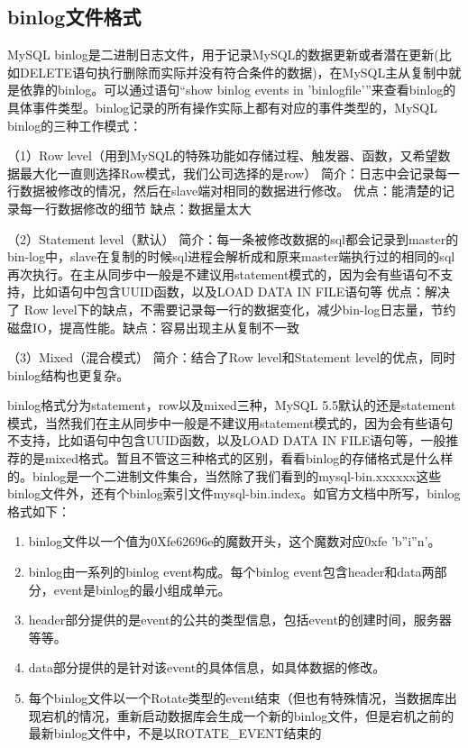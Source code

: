 \documentclass[../../../interview-questions.tex]{subfiles}
\begin{document}
\subsection{binlog文件格式}

MySQL binlog是二进制日志文件，用于记录MySQL的数据更新或者潜在更新(比如DELETE语句执行删除而实际并没有符合条件的数据)，在MySQL主从复制中就是依靠的binlog。可以通过语句“show binlog events in 'binlogfile'”来查看binlog的具体事件类型。binlog记录的所有操作实际上都有对应的事件类型的，MySQL binlog的三种工作模式：

（1）Row level（用到MySQL的特殊功能如存储过程、触发器、函数，又希望数据最大化一直则选择Row模式，我们公司选择的是row）
简介：日志中会记录每一行数据被修改的情况，然后在slave端对相同的数据进行修改。
优点：能清楚的记录每一行数据修改的细节
缺点：数据量太大

（2）Statement level（默认）
简介：每一条被修改数据的sql都会记录到master的bin-log中，slave在复制的时候sql进程会解析成和原来master端执行过的相同的sql再次执行。在主从同步中一般是不建议用statement模式的，因为会有些语句不支持，比如语句中包含UUID函数，以及LOAD DATA IN FILE语句等
优点：解决了 Row level下的缺点，不需要记录每一行的数据变化，减少bin-log日志量，节约磁盘IO，提高性能。缺点：容易出现主从复制不一致

（3）Mixed（混合模式）
简介：结合了Row level和Statement level的优点，同时binlog结构也更复杂。


binlog格式分为statement，row以及mixed三种，MySQL 5.5默认的还是statement模式，当然我们在主从同步中一般是不建议用statement模式的，因为会有些语句不支持，比如语句中包含UUID函数，以及LOAD DATA IN FILE语句等，一般推荐的是mixed格式。暂且不管这三种格式的区别，看看binlog的存储格式是什么样的。binlog是一个二进制文件集合，当然除了我们看到的mysql-bin.xxxxxx这些binlog文件外，还有个binlog索引文件mysql-bin.index。如官方文档中所写，binlog格式如下：

\begin{enumerate}
\item {binlog文件以一个值为0Xfe62696e的魔数开头，这个魔数对应0xfe 'b''i''n'。}
\item {binlog由一系列的binlog event构成。每个binlog event包含header和data两部分，event是binlog的最小组成单元。}
\item {header部分提供的是event的公共的类型信息，包括event的创建时间，服务器等等。}
\item {data部分提供的是针对该event的具体信息，如具体数据的修改。}
\item {每个binlog文件以一个Rotate类型的event结束（但也有特殊情况，当数据库出现宕机的情况，重新启动数据库会生成一个新的binlog文件，但是宕机之前的最新binlog文件中，不是以ROTATE\_EVENT结束的}
\end{enumerate}
\end{document}
